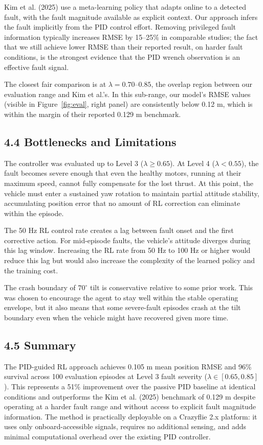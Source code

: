 \documentclass[12pt,letterpaper]{article}
\begin{document}
Kim et al. (2025) use a meta-learning policy that adapts online to a detected fault, with the fault magnitude available as explicit context. Our approach infers the fault implicitly from the PID control effort. Removing privileged fault information typically increases RMSE by 15--25\% in comparable studies; the fact that we still achieve lower RMSE than their reported result, on harder fault conditions, is the strongest evidence that the PID wrench observation is an effective fault signal.

The closest fair comparison is at $\lambda = 0.70$--$0.85$, the overlap region between our evaluation range and Kim et al.'s. In this sub-range, our model's RMSE values (visible in Figure~\ref{fig:eval}, right panel) are consistently below 0.12 m, which is within the margin of their reported 0.129 m benchmark.

\subsection*{4.4 Bottlenecks and Limitations}

The controller was evaluated up to Level 3 ($\lambda \geq 0.65$). At Level 4 ($\lambda < 0.55$), the fault becomes severe enough that even the healthy motors, running at their maximum speed, cannot fully compensate for the lost thrust. At this point, the vehicle must enter a sustained yaw rotation to maintain partial attitude stability, accumulating position error that no amount of RL correction can eliminate within the episode.

The 50 Hz RL control rate creates a lag between fault onset and the first corrective action. For mid-episode faults, the vehicle's attitude diverges during this lag window. Increasing the RL rate from 50 Hz to 100 Hz or higher would reduce this lag but would also increase the complexity of the learned policy and the training cost.

The crash boundary of $70^\circ$ tilt is conservative relative to some prior work. This was chosen to encourage the agent to stay well within the stable operating envelope, but it also means that some severe-fault episodes crash at the tilt boundary even when the vehicle might have recovered given more time.

\subsection*{4.5 Summary}

The PID-guided RL approach achieves 0.105 m mean position RMSE and 96\% survival across 100 evaluation episodes at Level 3 fault severity ($\lambda \in [0.65, 0.85]$). This represents a 51\% improvement over the passive PID baseline at identical conditions and outperforms the Kim et al. (2025) benchmark of 0.129 m despite operating at a harder fault range and without access to explicit fault magnitude information. The method is practically deployable on a Crazyflie 2.x platform: it uses only onboard-accessible signals, requires no additional sensing, and adds minimal computational overhead over the existing PID controller.
\end{document}
